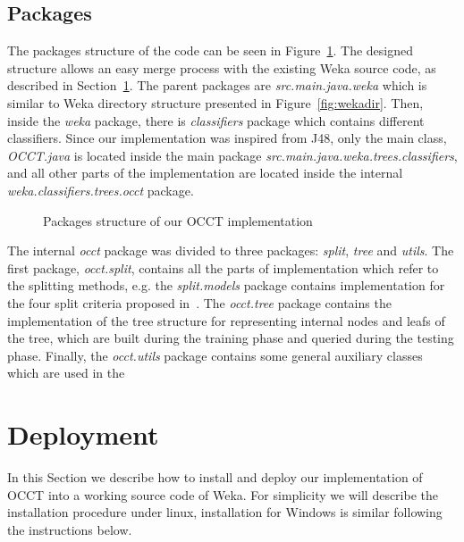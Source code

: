 \documentclass[a4paper,12pt]{article}
\begin{document}
\begin{spacing}{1.5}
\pagebreak

\subsection{Packages}
The packages structure of the code can be seen in Figure~\ref{fig:packages}. The designed structure allows an easy merge process with the existing Weka source code, as described in Section~\ref{sec:deployment}. The parent packages are {\em src.main.java.weka} which is similar to Weka directory structure presented in Figure~\ref{fig:wekadir}. Then, inside the {\em weka} package, there is {\em classifiers} package which contains different classifiers. Since our implementation was inspired from J48, only the main class, {\em OCCT.java} is located inside the main package {\em src.main.java.weka.trees.classifiers}, and all other parts of the implementation are located inside the internal {\em weka.classifiers.trees.occt} package.
\begin{figure}[!h]
    \caption{Packages structure of our OCCT implementation}
    \label{fig:packages}
\end{figure}

The internal {\em occt} package was divided to three packages: {\em split}, {\em tree} and {\em utils}. The first package, {\em occt.split}, contains all the parts of implementation which refer to the splitting methods, e.g. the {\em split.models} package contains implementation for the four split criteria proposed in~\cite{dror2011thesis,dror2014occt}. The {\em occt.tree} package contains the implementation of the tree structure for representing internal nodes and leafs of the tree, which are built during the training phase and queried during the testing phase. Finally, the {\em occt.utils} package contains some general auxiliary classes which are used in the
\pagebreak
\section{Deployment}\label{sec:deployment}
In this Section we describe how to install and deploy our implementation of OCCT into a working source code of Weka. For simplicity we will describe the installation procedure under linux, installation for Windows is similar following the instructions below.


\end{spacing}
\end{document}
